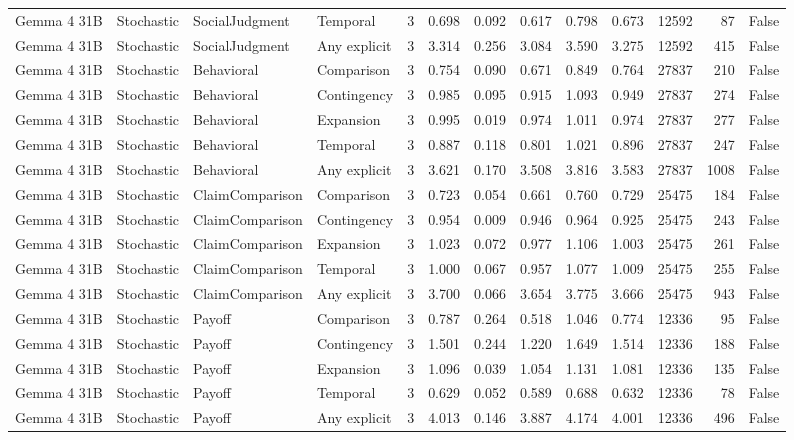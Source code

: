 \begin{tabular}{llllrrrrrrrrr}
Gemma 4 31B & Stochastic & SocialJudgment & Temporal & 3 & 0.698 & 0.092 & 0.617 & 0.798 & 0.673 & 12592 & 87 & False \\
Gemma 4 31B & Stochastic & SocialJudgment & Any explicit & 3 & 3.314 & 0.256 & 3.084 & 3.590 & 3.275 & 12592 & 415 & False \\
Gemma 4 31B & Stochastic & Behavioral & Comparison & 3 & 0.754 & 0.090 & 0.671 & 0.849 & 0.764 & 27837 & 210 & False \\
Gemma 4 31B & Stochastic & Behavioral & Contingency & 3 & 0.985 & 0.095 & 0.915 & 1.093 & 0.949 & 27837 & 274 & False \\
Gemma 4 31B & Stochastic & Behavioral & Expansion & 3 & 0.995 & 0.019 & 0.974 & 1.011 & 0.974 & 27837 & 277 & False \\
Gemma 4 31B & Stochastic & Behavioral & Temporal & 3 & 0.887 & 0.118 & 0.801 & 1.021 & 0.896 & 27837 & 247 & False \\
Gemma 4 31B & Stochastic & Behavioral & Any explicit & 3 & 3.621 & 0.170 & 3.508 & 3.816 & 3.583 & 27837 & 1008 & False \\
Gemma 4 31B & Stochastic & ClaimComparison & Comparison & 3 & 0.723 & 0.054 & 0.661 & 0.760 & 0.729 & 25475 & 184 & False \\
Gemma 4 31B & Stochastic & ClaimComparison & Contingency & 3 & 0.954 & 0.009 & 0.946 & 0.964 & 0.925 & 25475 & 243 & False \\
Gemma 4 31B & Stochastic & ClaimComparison & Expansion & 3 & 1.023 & 0.072 & 0.977 & 1.106 & 1.003 & 25475 & 261 & False \\
Gemma 4 31B & Stochastic & ClaimComparison & Temporal & 3 & 1.000 & 0.067 & 0.957 & 1.077 & 1.009 & 25475 & 255 & False \\
Gemma 4 31B & Stochastic & ClaimComparison & Any explicit & 3 & 3.700 & 0.066 & 3.654 & 3.775 & 3.666 & 25475 & 943 & False \\
Gemma 4 31B & Stochastic & Payoff & Comparison & 3 & 0.787 & 0.264 & 0.518 & 1.046 & 0.774 & 12336 & 95 & False \\
Gemma 4 31B & Stochastic & Payoff & Contingency & 3 & 1.501 & 0.244 & 1.220 & 1.649 & 1.514 & 12336 & 188 & False \\
Gemma 4 31B & Stochastic & Payoff & Expansion & 3 & 1.096 & 0.039 & 1.054 & 1.131 & 1.081 & 12336 & 135 & False \\
Gemma 4 31B & Stochastic & Payoff & Temporal & 3 & 0.629 & 0.052 & 0.589 & 0.688 & 0.632 & 12336 & 78 & False \\
Gemma 4 31B & Stochastic & Payoff & Any explicit & 3 & 4.013 & 0.146 & 3.887 & 4.174 & 4.001 & 12336 & 496 & False \\

\end{tabular}
